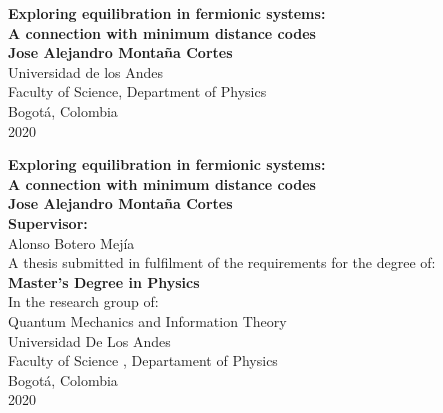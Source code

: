 \begin{center}
\begin{figure}
\centering%
%
\end{figure}
\thispagestyle{empty} \vspace*{0.0cm} \textbf{\huge
 Exploring equilibration in fermionic systems: \\ A connection with minimum distance codes} \\[4.0cm]
\Large\textbf{Jose Alejandro Montaña Cortes}\\[5.5cm]
\small Universidad de los Andes\\
Faculty of Science, Department of Physics\\
Bogotá, Colombia\\
2020\\
\end{center}

\newpage{\pagestyle{empty}\cleardoublepage}

\newpage
\begin{center}
\thispagestyle{empty} \vspace*{0cm} \textbf{\huge Exploring equilibration in fermionic systems: \\ A connection with minimum distance codes } \\[1.8cm]
\Large\textbf{Jose Alejandro Montaña Cortes}\\[2.5cm]
\textbf{Supervisor:}\\[1.0cm]
Alonso Botero Mejía\\[2.0cm]
\small A thesis submitted in fulfilment of the requirements for the degree of:\\
\textbf{Master's Degree in Physics}\\
In the research group of:\\
Quantum Mechanics and Information Theory\\[2.0cm]
Universidad De Los Andes\\
Faculty of Science , Departament of Physics\\
Bogotá, Colombia\\
2020\\



\end{center}

